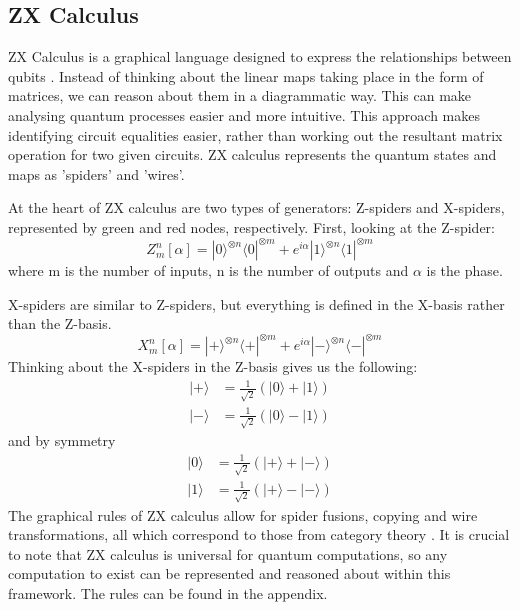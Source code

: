 \documentclass[12pt]{article}
\newcommand{\newp}
    {
    \vskip 0.5cm 
  }
\numberwithin{equation}{section}
\begin{document}
\subsection{ZX Calculus}
ZX Calculus is a graphical language designed to express the relationships between 
qubits \autocite{a2018_pyzx}. Instead of thinking about the linear maps taking place
in the form of matrices, we can reason about them in a diagrammatic way. This 
can make analysing quantum processes easier and more intuitive. This approach 
makes identifying circuit equalities easier, rather than working out the resultant 
matrix operation for two given circuits. ZX calculus represents the quantum states 
and maps as 'spiders' and 'wires'. 
\newp 
At the heart of ZX calculus are two types of generators: Z-spiders and X-spiders,
represented by green and red nodes, respectively. First, looking at the Z-spider: 
\begin{equation}
  Z^n_m[\alpha] = |0\rangle^{\otimes n}\langle0|^{\otimes m}+e^{i\alpha}
  |1\rangle^{\otimes n}\langle1|^{\otimes m}
\end{equation}
where m is the number of inputs, n is the number of outputs and $\alpha$ is the 
phase.
\newp
X-spiders are similar to Z-spiders, but everything is defined in the X-basis rather 
than the Z-basis. 
\begin{equation}
  X^n_m[\alpha] = |+\rangle^{\otimes n}\langle +|^{\otimes m}+e^{i\alpha}| -\rangle 
  ^{\otimes n}\langle - | ^{\otimes m}
\end{equation}
Thinking about the X-spiders in the Z-basis gives us the following: 
\begin{equation}
  \begin{split}
    |+\rangle &= \frac{1}{\sqrt2}(|0\rangle+|1\rangle)\\
    |-\rangle &= \frac{1}{\sqrt2}(|0\rangle-|1\rangle)
  \end{split}
\end{equation}
and by symmetry
\begin{equation}
  \begin{split}
    |0\rangle &= \frac{1}{\sqrt2}(|+\rangle+|-\rangle)\\
    |1\rangle &= \frac{1}{\sqrt2}(|+\rangle-|-\rangle)
  \end{split}
\end{equation}
The graphical rules of ZX calculus allow for spider fusions, copying and wire 
transformations, all which correspond to those from category theory \autocite{zx-calc,zxcalc,tufts}. It is crucial 
to note that ZX calculus is universal for quantum computations, so any computation 
to exist can be represented and reasoned about within this framework. The rules can be found in the appendix.
\end{document}
